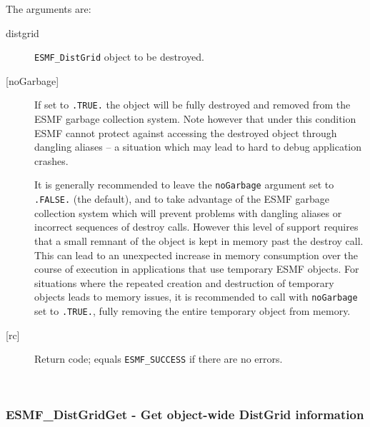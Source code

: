    The arguments are:
   \begin{description}
   \item[distgrid] 
        {\tt ESMF\_DistGrid} object to be destroyed.
   \item[{[noGarbage]}]
        If set to {\tt .TRUE.} the object will be fully destroyed and removed
        from the ESMF garbage collection system. Note however that under this 
        condition ESMF cannot protect against accessing the destroyed object 
        through dangling aliases -- a situation which may lead to hard to debug 
        application crashes.
   
        It is generally recommended to leave the {\tt noGarbage} argument
        set to {\tt .FALSE.} (the default), and to take advantage of the ESMF 
        garbage collection system which will prevent problems with dangling
        aliases or incorrect sequences of destroy calls. However this level of
        support requires that a small remnant of the object is kept in memory
        past the destroy call. This can lead to an unexpected increase in memory
        consumption over the course of execution in applications that use 
        temporary ESMF objects. For situations where the repeated creation and 
        destruction of temporary objects leads to memory issues, it is 
        recommended to call with {\tt noGarbage} set to {\tt .TRUE.}, fully 
        removing the entire temporary object from memory.
   \item[{[rc]}] 
        Return code; equals {\tt ESMF\_SUCCESS} if there are no errors.
   \end{description}
   
 
\mbox{}\hrulefill\ 
 
\subsubsection [ESMF\_DistGridGet] {ESMF\_DistGridGet - Get object-wide DistGrid information}


